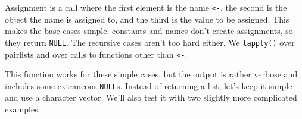 Assignment is a call where the first element is the name
\texttt{\textless{}-}, the second is the object the name is assigned to,
and the third is the value to be assigned. This makes the base cases
simple: constants and names don't create assignments, so they return
\texttt{NULL}. The recursive cases aren't too hard either. We
\texttt{lapply()} over pairlists and over calls to functions other than
\texttt{\textless{}-}.

\begin{Shaded}
\begin{Highlighting}[]
\StringTok{ }
  \StringTok{ }
    \NormalTok{(x[[}\NormalTok{]], }\NormalTok{(}\DataTypeTok{<-}\NormalTok{))) \{}
      \NormalTok{x[[}\NormalTok{]]}
    \NormalTok{\}}
    \NormalTok{(}\NormalTok{, }
       \NormalTok{)}
  \NormalTok{\}}
\NormalTok{\}}
\NormalTok{(}\StringTok{ }\NormalTok{))}
\NormalTok{(}\NormalTok{(\{}
  \StringTok{ }
  \StringTok{ }
\NormalTok{\}))}
\CommentTok{#> [[1]]}
\CommentTok{#> }
\CommentTok{#> [[2]]}
\CommentTok{#> }
\CommentTok{#> [[3]]}
\end{Highlighting}
\end{Shaded}

This function works for these simple cases, but the output is rather
verbose and includes some extraneous \texttt{NULL}s. Instead of
returning a list, let's keep it simple and use a character vector. We'll
also test it with two slightly more complicated examples:

